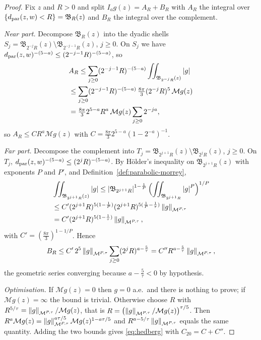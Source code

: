 \documentclass[11pt,reqno]{amsart}
\begin{document}
\begin{proof}
Fix $z$ and $R>0$ and split $I_{a}g(z)=A_{R}+B_{R}$ with $A_{R}$ the integral
over $\{d_{\mathrm{par}}(z,w)<R\}=\mathfrak{B}_{R}(z)$ and $B_{R}$ the integral over the
complement.

\emph{Near part.} Decompose $\mathfrak{B}_{R}(z)$ into the dyadic shells
$S_{j}=\mathfrak{B}_{2^{-j}R}(z)\setminus\mathfrak{B}_{2^{-j-1}R}(z)$,
$j\ge0$. On $S_{j}$ we have $d_{\mathrm{par}}(z,w)^{-(5-a)}\le(2^{-j-1}R)^{-(5-a)}$, so
\[\begin{aligned}
  &A_{R}\le\sum_{j\ge0}(2^{-j-1}R)^{-(5-a)}\iint_{\mathfrak{B}_{2^{-j}R}(z)}\left\lvert g \right\rvert
  \\ &\le\sum_{j\ge0}(2^{-j-1}R)^{-(5-a)}\,\tfrac{8\pi}{3}(2^{-j}R)^{5}\,\mathcal{M}g(z)
  \\ &=\tfrac{8\pi}{3}2^{5-a}R^{a}\,\mathcal{M}g(z)\sum_{j\ge0}2^{-ja},
\end{aligned}\]
so $A_{R}\le C R^{a}\mathcal{M}g(z)$ with
$C=\tfrac{8\pi}{3}2^{5-a}(1-2^{-a})^{-1}$.

\emph{Far part.} Decompose the complement into
$T_{j}=\mathfrak{B}_{2^{j+1}R}(z)\setminus\mathfrak{B}_{2^{j}R}(z)$, $j\ge0$. On
$T_{j}$, $d_{\mathrm{par}}(z,w)^{-(5-a)}\le(2^{j}R)^{-(5-a)}$. By H\"older's inequality on
$\mathfrak{B}_{2^{j+1}R}(z)$ with exponents $P$ and $P'$, and
Definition~\ref{def:parabolic-morrey},
\[\begin{aligned}
  &\iint_{\mathfrak{B}_{2^{j+1}R}(z)}\left\lvert g \right\rvert
  \le\left\lvert \mathfrak{B}_{2^{j+1}R} \right\rvert^{1-\frac1P}
     \Bigl(\iint_{\mathfrak{B}_{2^{j+1}R}}\left\lvert g \right\rvert^{P}\Bigr)^{1/P}
  \\ &\le C'(2^{j+1}R)^{5(1-\frac1P)}(2^{j+1}R)^{5(\frac1P-\frac1\tau)}
      \left\lVert g \right\rVert_{\mathcal{M}^{P,\tau}}
  \\ &= C'(2^{j+1}R)^{5(1-\frac1\tau)}\left\lVert g \right\rVert_{\mathcal{M}^{P,\tau}},
\end{aligned}\]
with $C'=(\tfrac{8\pi}{3})^{1-1/P}$. Hence
\[
  B_{R}\le C'\,2^{5}\left\lVert g \right\rVert_{\mathcal{M}^{P,\tau}}
    \sum_{j\ge0}(2^{j}R)^{a-\frac5\tau}
  = C''R^{a-\frac5\tau}\left\lVert g \right\rVert_{\mathcal{M}^{P,\tau}},
\]
the geometric series converging because $a-\tfrac5\tau<0$ by hypothesis.

\emph{Optimisation.} If $\mathcal{M}g(z)=0$ then $g=0$ a.e.\ and there is
nothing to prove; if $\mathcal{M}g(z)=\infty$ the bound is trivial. Otherwise
choose $R$ with
$R^{5/\tau}=\left\lVert g \right\rVert_{\mathcal{M}^{P,\tau}}/\mathcal{M}g(z)$, that is
$R=\bigl(\left\lVert g \right\rVert_{\mathcal{M}^{P,\tau}}/\mathcal{M}g(z)\bigr)^{\tau/5}$. Then
$R^{a}\mathcal{M}g(z)
 =\left\lVert g \right\rVert_{\mathcal{M}^{P,\tau}}^{a\tau/5}\mathcal{M}g(z)^{1-a\tau/5}$ and
$R^{a-5/\tau}\left\lVert g \right\rVert_{\mathcal{M}^{P,\tau}}$ equals the same quantity. Adding
the two bounds gives \eqref{eq:hedberg} with $C_{20}=C+C''$.
\end{proof}
\end{document}
